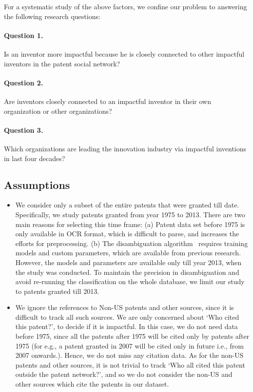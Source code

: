For a systematic study of the above factors, we confine our problem to
answering the following research questions:

\paragraph{Question 1.} Is an inventor more impactful because he is closely
connected to other impactful inventors in the patent social network? 

\paragraph{Question  2.} Are inventors closely connected to an impactful
inventor in their own organization or other organizations? %

\paragraph{Question  3.} Which organizations are leading the innovation industry via impactful inventions in last four decades? %


\subsection{Assumptions}
\label{sec:assumptions}
	\begin{itemize}
		\item We consider only a subset of the entire patents that were granted till
		date. Specifically, we study patents granted from year 1975 to 2013. There are
		two main reasons for selecting this time frame: (a) Patent data set before
		1975 is only available in OCR format, which is difficult to parse, and
		increases the efforts for preprocessing. (b) The disambiguation
		algorithm~\cite{disambiguation}  requires training models and custom
		parameters, which are available from previous research. However, the models
		and parameters are available only till year 2013, when the study was
		conducted. To maintain the precision in disambiguation and avoid re-running
		the classification on the whole database, we limit our study to patents
		granted till 2013.
		\item We ignore the references to Non-US patents and other sources, since it
		is difficult to track all such sources.  We are only concerned about `Who
		cited this patent?', to decide if it is impactful. In this case, we do not
		need data before 1975, since all the patents after 1975 will be cited only by
		patents after 1975 (for e.g., a patent granted in 2007 will be cited only in
		future i.e., from 2007 onwards.). Hence, we do not miss any citation data. As
		for the non-US patents and other sources, it is not trivial to track `Who all
		cited this patent outside the patent network?', and so we do not consider
		the non-US and other sources which cite the patents in our dataset.
	\end{itemize}

